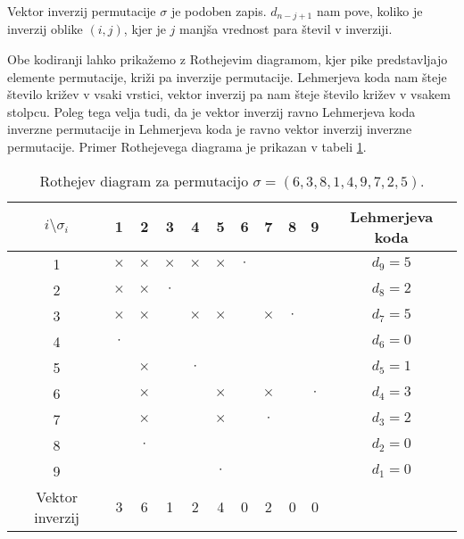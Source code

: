 \documentclass[a4paper, 12pt]{book}
\begin{document}
Vektor inverzij permutacije $\sigma$ je podoben zapis. $d_{n-j+1}$ nam pove, koliko je inverzij oblike $(i, j)$, kjer je $j$ manjša vrednost para števil v inverziji.

Obe kodiranji lahko prikažemo z Rothejevim diagramom, kjer pike predstavljajo elemente permutacije, križi pa inverzije permutacije. Lehmerjeva koda nam šteje število križev v vsaki vrstici, vektor inverzij pa nam šteje število križev v vsakem stolpcu. Poleg tega velja tudi, da je vektor inverzij ravno Lehmerjeva koda inverzne permutacije in Lehmerjeva koda je ravno vektor inverzij inverzne permutacije. Primer Rothejevega diagrama je prikazan v tabeli \ref{tbl:rothejev_diagram}.

\begin{table}
    \begin{center}
        \begin{tabular}{ |c|c|c|c|c|c|c|c|c|c|c| } 
        \hline
            $i \setminus \sigma_i$ & 1 & 2 & 3 & 4 & 5 & 6 & 7 & 8 & 9 & Lehmerjeva koda  \\ 
        \hline
            1 & $\times$ & $\times$ & $\times$ & $\times$ & $\times$ & $\cdot$ & & & & $d_9 = 5$  \\ 
        \hline
            2 & $\times$ & $\times$ & $\cdot$ & & & & & & & $d_8 = 2$  \\ 
        \hline
            3 & $\times$ & $\times$ & & $\times$ & $\times$ & & $\times$ & $\cdot$ & & $d_7 = 5$  \\ 
        \hline
            4 & $\cdot$ & & & & & & & & & $d_6 = 0$  \\ 
        \hline
            5 & & $\times$ & & $\cdot$ & & & & & & $d_5 = 1$  \\ 
        \hline
            6 & & $\times$ & & & $\times$ & & $\times$ & & $\cdot$ & $d_4 = 3$  \\ 
        \hline
            7 & & $\times$ & & & $\times$ & & $\cdot$ & & & $d_3 = 2$  \\ 
        \hline
            8 & & $\cdot$ & & & & & & & & $d_2 = 0$  \\ 
        \hline
            9 & & & & & $\cdot$ & & & & & $d_1 = 0$  \\ 
        \hline
            Vektor inverzij & 3 & 6 & 1 & 2 & 4 & 0 & 2 & 0 & 0 &  \\ 
        \hline
        \end{tabular}
    \end{center}
    \caption{ Rothejev diagram za permutacijo $\sigma = (6, 3, 8, 1, 4, 9, 7, 2, 5)$. }
    \label{tbl:rothejev_diagram}
\end{table}
\end{document}
